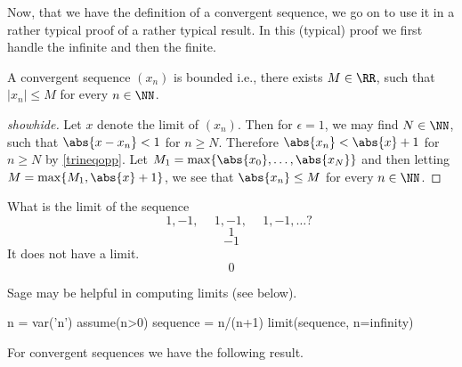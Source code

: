 \documentclass{article}
\begin{document}
Now, that we have the definition of a convergent sequence, we go on to use it in a rather
typical proof of a rather typical result. In this (typical) proof we first handle the
infinite and then the finite.

\begin{proposition}\label{propconvbounded}
  A convergent sequence $(x_n)$ is bounded i.e., there exists $M\in \RR$, such that
  $|x_n| \leq M$ for every $n\in \NN$.
\end{proposition}
  \begin{proof}[showhide]
    Let $x$ denote the limit of $(x_n)$. Then for $\epsilon = 1$, we may find
    $N\in \NN$, such that $\abs{x - x_n} < 1$ for $n\geq N$. Therefore
    $\abs{x_n} < \abs{x} + 1$ for $n\geq N$ by \eqref{trineqopp}. Let
    $M_1 = \max\{\abs{x_0}, \dots, \abs{x_N}\}$ and then letting
    $M = \max\{M_1, \abs{x} + 1\}$, we see that $\abs{x_n} \leq M$
    for every $n\in \NN$.
  \end{proof}



\newcommand{\phmi}{\phantom{-}}
\begin{quizexercise}[showhide]
\begin{quiz}
  \question
  What is the limit of the sequence
  $$
  \phmi 1, -1, \phmi 1, -1, \phmi 1, -1, \dots ?
  $$
  $$1$$
  $$-1$$
  It does not have a limit.
  $$0$$
\end{quiz}
\end{quizexercise}

Sage may be helpful in computing limits (see below).

\begin{sage}
n = var('n')
assume(n>0)
sequence = n/(n+1)
limit(sequence, n=infinity)
\end{sage}


For convergent sequences we have the following result.
\end{document}
